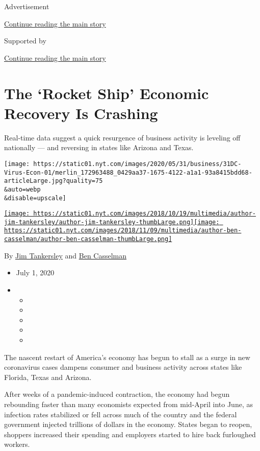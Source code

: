 Advertisement

\protect\hyperlink{after-top}{Continue reading the main story}

Supported by

\protect\hyperlink{after-sponsor}{Continue reading the main story}

\hypertarget{the-rocket-ship-economic-recovery-is-crashing}{%
\section{The `Rocket Ship' Economic Recovery Is
Crashing}\label{the-rocket-ship-economic-recovery-is-crashing}}

Real-time data suggest a quick resurgence of business activity is
leveling off nationally --- and reversing in states like Arizona and
Texas.

\texttt{[image: https://static01.nyt.com/images/2020/05/31/business/31DC-Virus-Econ-01/merlin\_172963488\_0429aa37-1675-4122-a1a1-93a8415bdd68-articleLarge.jpg?quality=75\\\&auto=webp\\\&disable=upscale]}

\href{https://www.nytimes.com/by/jim-tankersley}{\texttt{[image: https://static01.nyt.com/images/2018/10/19/multimedia/author-jim-tankersley/author-jim-tankersley-thumbLarge.png]}}\href{https://www.nytimes.com/by/ben-casselman}{\texttt{[image: https://static01.nyt.com/images/2018/11/09/multimedia/author-ben-casselman/author-ben-casselman-thumbLarge.png]}}

By \href{https://www.nytimes.com/by/jim-tankersley}{Jim Tankersley} and
\href{https://www.nytimes.com/by/ben-casselman}{Ben Casselman}

\begin{itemize}
\item
  July 1, 2020
\item
  \begin{itemize}
  \item
  \item
  \item
  \item
  \item
  \end{itemize}
\end{itemize}

The nascent restart of America's economy has begun to stall as a surge
in new coronavirus cases dampens consumer and business activity across
states like Florida, Texas and Arizona.

After weeks of a pandemic-induced contraction, the economy had begun
rebounding faster than many economists expected from mid-April into
June, as infection rates stabilized or fell across much of the country
and the federal government injected trillions of dollars in the economy.
States began to reopen, shoppers increased their spending and employers
started to hire back furloughed workers.


